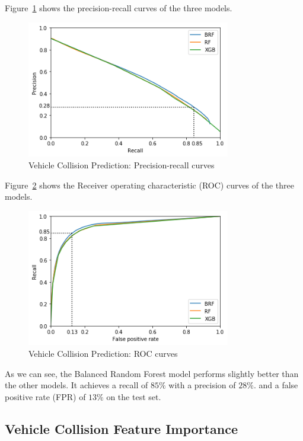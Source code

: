 \documentclass[conference]{IEEEtran}
\begin{document}
Figure~\ref{fig:precision-recall} shows the precision-recall curves of the three models.

\begin{figure}[htbp]
\centerline{\includegraphics[height=6cm, keepaspectratio]{Figures/pr.png}}
\caption{Vehicle Collision Prediction: Precision-recall curves}
\label{fig:precision-recall}
\end{figure}

Figure~\ref{fig:roc} shows the Receiver operating characteristic (ROC) curves of the three models.

\begin{figure}[htbp]
\centerline{\includegraphics[height=6cm, keepaspectratio]{Figures/roc.png}}
\caption{Vehicle Collision Prediction: ROC curves}
\label{fig:roc}
\end{figure}

As we can see, the Balanced Random Forest model performs slightly better than the other models.
It achieves a recall of $85\%$ with a precision of $28\%$. and a false positive rate (FPR) of $13\%$ on the test set.


\subsection{Vehicle Collision Feature Importance}
\end{document}
